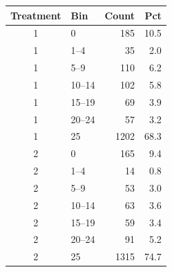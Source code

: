 \begin{tabular}{clrr}
  \toprule
  Treatment & Bin & Count & Pct \\ 
  \midrule
  1 & 0 & 185 & 10.5 \\ 
  1 & 1--4 & 35 & 2.0 \\ 
  1 & 5--9 & 110 & 6.2 \\ 
  1 & 10--14 & 102 & 5.8 \\ 
  1 & 15--19 & 69 & 3.9 \\ 
  1 & 20--24 & 57 & 3.2 \\ 
  1 & 25 & 1202 & 68.3 \\ 
  2 & 0 & 165 & 9.4 \\ 
  2 & 1--4 & 14 & 0.8 \\ 
  2 & 5--9 & 53 & 3.0 \\ 
  2 & 10--14 & 63 & 3.6 \\ 
  2 & 15--19 & 59 & 3.4 \\ 
  2 & 20--24 & 91 & 5.2 \\ 
  2 & 25 & 1315 & 74.7 \\ 
  \bottomrule
\end{tabular}
